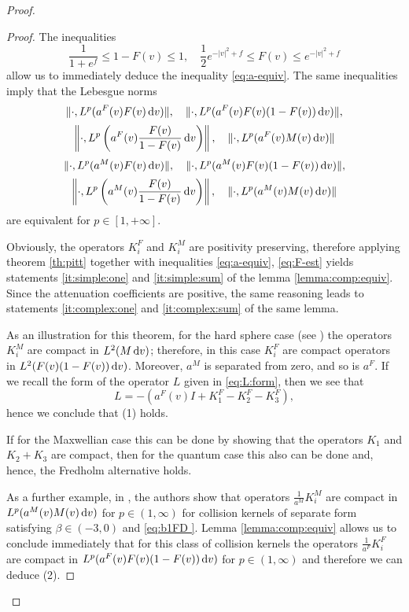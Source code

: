 \begin{proof}
\begin{proof}
The inequalities 
\begin{equation}\label{eq:F-est}\frac{1}{1+e^{f}}\le 1-F(v)\le 1, \quad \frac 12 e^{-|v|^2+f}\le F(v)\le e^{-|v|^2+f}\end{equation}
allow us to immediately deduce the inequality \eqref{eq:a-equiv}. The same inequalities imply that the Lebesgue norms
\[\|\cdot, L^p(a^F(v)F(v){\,\mathrm{d} v})\|,\quad \|\cdot, L^p(a^F(v)F(v)(1-F(v)){\,\mathrm{d} v})\|,\]\[ \left\|\cdot, L^p\left(a^F(v)\frac{F(v)}{1-F(v)}{\,\mathrm{d} v}\right)\right\|,\quad \|\cdot, L^p(a^F(v)M(v){\,\mathrm{d} v})\|\]
\[\|\cdot, L^p(a^M(v)F(v){\,\mathrm{d} v})\|,\quad \|\cdot, L^p(  a^M(v)F(v)(1-F(v)){\,\mathrm{d} v})\|,\]\[ \left\|\cdot, L^p\left( a^M(v)\frac{F(v)}{1-F(v)}{\,\mathrm{d} v}\right)\right\|,\quad \|\cdot, L^p(  a^M(v)M(v){\,\mathrm{d} v})\|\]
are equivalent for $p\in[1,+\infty]$.


Obviously, the operators $K_i^F$ and $K_i^M$ are positivity preserving, therefore  applying  theorem \ref{th:pitt} together with inequalities \eqref{eq:a-equiv}, \eqref{eq:F-est} yields statements \ref{it:simple:one} and \ref{it:simple:sum} of the lemma \ref{lemma:comp:equiv}. Since the attenuation coefficients are   positive, the same reasoning leads to   statements \ref{it:complex:one} and \ref{it:complex:sum} of the same lemma.




As an illustration for this theorem, for the hard sphere case (see \cite{Glassey1987Cauchy}) the operators $K^M_i$ are compact in $L^2(M{\,\mathrm{d} v})$; therefore, in this case $K^F_i$ are  compact operators in $L^2( F(v)(1-F(v)){\,\mathrm{d} v})$. Moreover, $a^M$ is separated from zero,  and so is $a^F$. If we recall the form of the operator $L$ given in \eqref{eq:L:form}, then we see that \begin{equation}
	L = -\left(a^F(v)I+K^F_1-K_2^F-K_3^F\right),\label{eq:L-K}
\end{equation}
hence we  conclude that (1) holds.

 If for the Maxwellian case this can be done by showing that the operators $K_1$ and $K_2+K_3$ are compact, then for the quantum case this also can be done and, hence, the Fredholm alternative holds.

 As a further example, in \cite{Levermore2010Compactness}, the authors show that operators $\frac{1}{a^M}K^M_i$ are compact in $L^p(a^M(v)M(v){\,\mathrm{d} v})$ for $p\in (1, \infty)$ for collision kernels of separate form satisfying $\beta\in (-3,0)$ and \eqref{eq:b1FD
}. Lemma \ref{lemma:comp:equiv} allows us to conclude immediately  that for this class of collision kernels the operators $\frac{1}{a^F}K^F_i$ are compact in $L^p( a^F(v)F(v)(1-F(v)){\,\mathrm{d} v})$ for $p\in (1, \infty)$ and therefore we can deduce (2).
		


\end{proof}
\end{proof}
